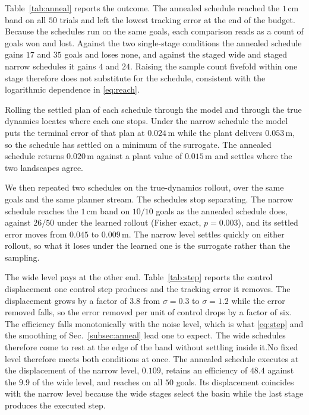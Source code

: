 \documentclass[letterpaper,10pt,conference]{ieeeconf}
\begin{document}
Table~\ref{tab:anneal} reports the outcome.
The annealed schedule reached the $1$\,cm band on all $50$ trials and left the lowest tracking error at the end of the budget.
Because the schedules run on the same goals, each comparison reads as a count of goals won and lost.
Against the two single-stage conditions the annealed schedule gains $17$ and $35$ goals and loses none, and against the staged wide and staged narrow schedules it gains $4$ and $24$.
Raising the sample count fivefold within one stage therefore does not substitute for the schedule, consistent with the logarithmic dependence in \eqref{eq:reach}.

Rolling the settled plan of each schedule through the model and through the true dynamics locates where each one stops.
Under the narrow schedule the model puts the terminal error of that plan at $0.024$\,m while the plant delivers $0.053$\,m, so the schedule has settled on a minimum of the surrogate.
The annealed schedule returns $0.020$\,m against a plant value of $0.015$\,m and settles where the two landscapes agree.

We then repeated two schedules on the true-dynamics rollout, over the same goals and the same planner stream.
The schedules stop separating.
The narrow schedule reaches the $1$\,cm band on $10/10$ goals as the annealed schedule does, against $26/50$ under the learned rollout (Fisher exact, $p = 0.003$), and its settled error moves from $0.045$ to $0.009$\,m.
The narrow level settles quickly on either rollout, so what it loses under the learned one is the surrogate rather than the sampling.

The wide level pays at the other end.
Table~\ref{tab:step} reports the control displacement one control step produces and the tracking error it removes.
The displacement grows by a factor of $3.8$ from $\sigma = 0.3$ to $\sigma = 1.2$ while the error removed falls, so the error removed per unit of control drops by a factor of six.
The efficiency falls monotonically with the noise level, which is what \eqref{eq:step} and the smoothing of Sec.~\ref{subsec:anneal} lead one to expect.
The wide schedules therefore come to rest at the edge of the band without settling inside it.No fixed level therefore meets both conditions at once.
The annealed schedule executes at the displacement of the narrow level, $0.109$, retains an efficiency of $48.4$ against the $9.9$ of the wide level, and reaches on all $50$ goals.
Its displacement coincides with the narrow level because the wide stages select the basin while the last stage produces the executed step.
\end{document}
